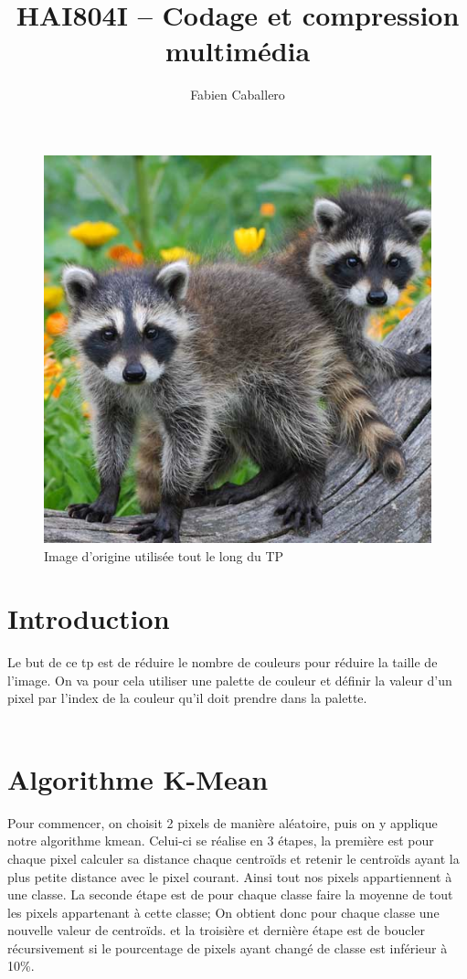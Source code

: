 \documentclass{article}
\title{HAI804I – Codage et compression multimédia
}
\author{Fabien Caballero}
\begin{document}
\maketitle
    \tableofcontents

\newpage

\begin{figure}[h]
\centerline{\includegraphics[scale=0.3]{./rendus/Nicoon.png}}
\caption{Image d'origine utilisée tout le long du TP}
\end{figure}

\section*{Introduction}
Le but de ce tp est de réduire le nombre de couleurs pour réduire la taille de l'image.
On va pour cela utiliser une palette de couleur et définir la valeur d'un pixel par l'index de la couleur qu'il doit prendre dans la palette.
\\\\
\section{Algorithme K-Mean }
Pour commencer, on choisit 2 pixels de manière aléatoire, puis on y applique notre algorithme kmean.
Celui-ci se réalise en 3 étapes, la première est pour chaque pixel calculer sa distance chaque centroïds et retenir le centroïds ayant la plus petite distance avec le pixel courant.
Ainsi tout nos pixels appartiennent à une classe.
La seconde étape est de pour chaque classe faire la moyenne de tout les pixels appartenant à cette classe;
On obtient donc pour chaque classe une nouvelle valeur de centroïds.
et la troisière et dernière étape est de boucler récursivement si le pourcentage de pixels ayant changé de classe est inférieur à 10\%.
\end{document}
